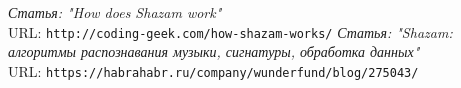 \begin{thebibliography}{99}
{\itshape Статья: "How does Shazam work"\,} \\URL: \texttt{http://coding-geek.com/how-shazam-works/}
{\itshape  Статья: "Shazam: алгоритмы распознавания музыки, сигнатуры, обработка данных"\, } \\URL: \texttt{https://habrahabr.ru/company/wunderfund/blog/275043/}
\end{thebibliography}
\pagebreak
